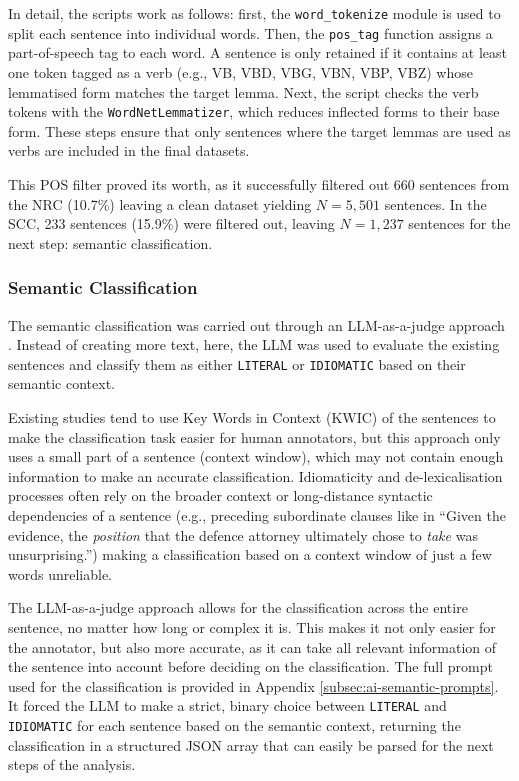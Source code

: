 \documentclass[11pt,a4paper]{article}
\begin{document}
In detail, the scripts work as follows: first, the \texttt{word\_tokenize} module is used to split each sentence into individual words. Then, the \texttt{pos\_tag} function assigns a part-of-speech tag to each word. A sentence is only retained if it contains at least one token tagged as a verb (e.g., VB, VBD, VBG, VBN, VBP, VBZ) whose lemmatised form matches the target lemma. Next, the script checks the verb tokens with the \texttt{WordNetLemmatizer}, which reduces inflected forms to their base form. These steps ensure that only sentences where the target lemmas are used as verbs are included in the final datasets. 

This POS filter proved its worth, as it successfully filtered out 660 sentences from the NRC (10.7\%) leaving a clean dataset yielding $N=5{,}501$ sentences. In the SCC, 233 sentences (15.9\%) were filtered out, leaving $N=1{,}237$ sentences for the next step: semantic classification. 

\subsubsection{Semantic Classification}\label{subsubsec:semantic-classification}

The semantic classification was carried out through an LLM-as-a-judge approach \parencite{zhengJudgingLLMas2023}. Instead of creating more text, here, the LLM was used to evaluate the existing sentences and classify them as either \texttt{LITERAL} or \texttt{IDIOMATIC} based on their semantic context.

Existing studies tend to use Key Words in Context (KWIC) of the sentences to make the classification task easier for human annotators, but this approach only uses a small part of a sentence (context window), which may not contain enough information to make an accurate classification. Idiomaticity and de-lexicalisation processes often rely on the broader context or long-distance syntactic dependencies of a sentence (e.g., preceding subordinate clauses like in ``Given the evidence, the \textit{position} that the defence attorney ultimately chose to \textit{take} was unsurprising.'') making a classification based on a context window of just a few words unreliable. 

The LLM-as-a-judge approach allows for the classification across the entire sentence, no matter how long or complex it is. This makes it not only easier for the annotator, but also more accurate, as it can take all relevant information of the sentence into account before deciding on the classification. The full prompt used for the classification is provided in Appendix \ref{subsec:ai-semantic-prompts}. It forced the LLM to make a strict, binary choice between \texttt{LITERAL} and \texttt{IDIOMATIC} for each sentence based on the semantic context, returning the classification in a structured JSON array that can easily be parsed for the next steps of the analysis.
\end{document}
